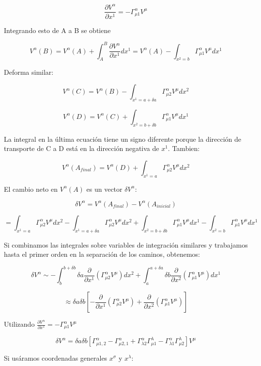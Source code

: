 \documentclass{article}
\begin{document}
\[
\frac{\partial V^\alpha}{\partial x^1} = - \Gamma^\alpha_{\mu 1} V^\mu
\]

Integrando esto de A a B se obtiene

\[
V^\alpha (B) = V^\alpha (A) + \int_A^B \frac{\partial V^\alpha}{\partial x^1} dx^1 
= V^\alpha (A) - \int_{x^2 = b} \Gamma^\alpha_{\mu 1} V^\mu dx^1
\]

Deforma similar:

\[
V^\alpha (C) = V^\alpha (B) - \int_{x^1 = a + \delta a} \Gamma^\alpha_{\mu 2} V^\mu dx^2
\]

\[
V^\alpha (D) = V^\alpha (C) + \int_{x^2 = b + \delta b} \Gamma^\alpha_{\mu 1} V^\mu dx^1
\]

La integral en la última ecuación tiene un signo diferente porque la dirección de transporte de C a D está en la dirección negativa de \( x^1 \). Tambien:

\[
V^\alpha (A_{final}) = V^\alpha (D) + \int_{x^1 = a} \Gamma^\alpha_{\mu 2} V^\mu dx^2
\]

El cambio neto en \( V^\alpha (A) \) es un vector \( \delta V^\alpha \):

\[
  \delta V^\alpha = V^\alpha (A_{final}) - V^\alpha (A_{inicial})
\]

\[
= \int_{x^1 = a} \Gamma^\alpha_{\mu 2} V^\mu dx^2 - \int_{x^1 = a + \delta a} \Gamma^\alpha_{\mu 2} V^\mu dx^2 + \int_{x^2 = b + \delta b} \Gamma^\alpha_{\mu 1} V^\mu dx^1 - \int_{x^2 = b} \Gamma^\alpha_{\mu 1} V^\mu dx^1
\]

Si combinamos las integrales sobre variables de integración similares y trabajamos hasta el primer orden en la separación de los caminos, obtenemos:

\[
\delta V^\alpha \sim - \int_b^{b + \delta b} \delta a \frac{\partial}{\partial x^1} (\Gamma^\alpha_{\mu 2} V^\mu) dx^2 + \int_a^{a + \delta a} \delta b \frac{\partial}{\partial x^2} (\Gamma^\alpha_{\mu 1} V^\mu) dx^1
\]

\[
\approx \delta a \delta b \left[ - \frac{\partial}{\partial x^1} (\Gamma^\alpha_{\mu 2} V^\mu) + \frac{\partial}{\partial x^2} (\Gamma^\alpha_{\mu 1} V^\mu) \right]
\]

Utilizando $\frac{\partial V^\alpha}{\partial x^1} = - \Gamma^\alpha_{\mu 1} V^\mu$

\[
\delta V^\alpha = \delta a \delta b \left[ \Gamma^\alpha_{\mu 1, 2} - \Gamma^\alpha_{\mu 2, 1} + \Gamma^\alpha_{\lambda 2} \Gamma^\lambda_{\mu 1} - \Gamma^\alpha_{\lambda 1} \Gamma^\lambda_{\mu 2} \right] V^\mu
\]


Si usáramos coordenadas generales $x^\sigma$ y $x^\lambda$:
\end{document}
